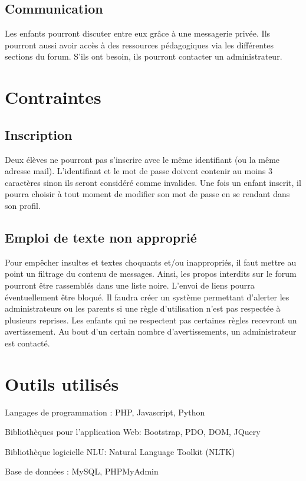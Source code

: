 \documentclass[12pt]{article}
\begin{document}
\subsection{Communication}
Les enfants pourront discuter entre eux grâce à une messagerie privée. Ils pourront aussi avoir accès à des ressources pédagogiques via les différentes sections du forum. 
S'ils ont besoin, ils pourront contacter un administrateur.
\section{Contraintes}
\subsection{Inscription}
Deux élèves ne pourront pas s'inscrire avec le même identifiant (ou la même adresse mail). L'identifiant et le mot de passe doivent contenir au moins 3 caractères sinon ils seront considéré comme invalides.
Une fois un enfant inscrit, il pourra choisir à tout moment de modifier son mot de passe en se rendant dans son profil.
\subsection{Emploi de texte non approprié}
Pour empêcher insultes et textes choquants et/ou inappropriés, il faut mettre au point un filtrage du contenu de messages. Ainsi, les propos interdits sur le forum pourront être rassemblés dans une liste noire. L'envoi de liens pourra éventuellement être bloqué.
Il faudra créer un système permettant d'alerter les administrateurs ou les parents si une règle d'utilisation n'est pas respectée à plusieurs reprises. Les enfants qui ne respectent pas certaines règles recevront un avertissement. Au bout d'un certain nombre d'avertissements, un administrateur est contacté.

\section{Outils utilisés}

Langages de programmation : PHP, Javascript, Python

Bibliothèques pour l’application Web: Bootstrap, PDO, DOM, JQuery

Bibliothèque logicielle NLU: Natural Language Toolkit (NLTK)

Base de données : MySQL, PHPMyAdmin
\end{document}
